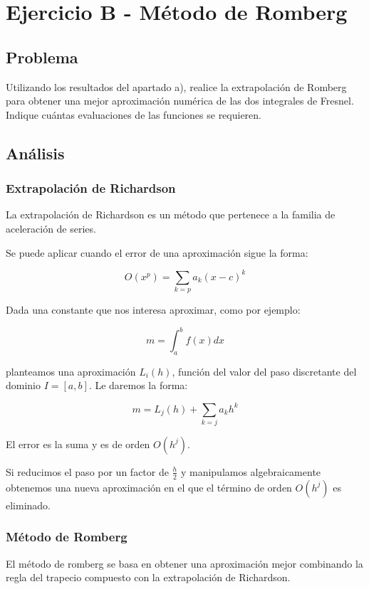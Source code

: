 \section{Ejercicio B - Método de Romberg}


\subsection{Problema}

Utilizando los resultados del apartado a), realice la extrapolación de Romberg para obtener una mejor aproximación numérica de las dos integrales de Fresnel. Indique cuántas evaluaciones de las funciones se requieren.


\subsection{Análisis}


\subsubsection{Extrapolación de Richardson}

La extrapolación de Richardson es un método que pertenece a la familia de aceleración de series.

Se puede aplicar cuando el error de una aproximación sigue la forma: 

$$
O(x^p) = \sum_{k=p} a_k (x - c)^k
$$

Dada una constante que nos interesa aproximar, como por ejemplo:

$$
m = \int_{a}^{b}  f(x) dx
$$

planteamos una aproximación $L_i(h)$, función del valor del paso discretante del dominio $I = [a, b]$. Le daremos la forma: 

$$
m = L_j(h) + \sum_{k = j}a_k h^k
$$

El error es la suma y es de orden $O(h^j)$.

Si reducimos el paso por un factor de $\frac{h}{2}$ y manipulamos algebraicamente obtenemos una nueva aproximación en el que el término de orden $O(h^j)$ es eliminado.


\subsubsection{Método de Romberg}

El método de romberg se basa en obtener una aproximación mejor combinando la regla del trapecio compuesto con la extrapolación de Richardson.

